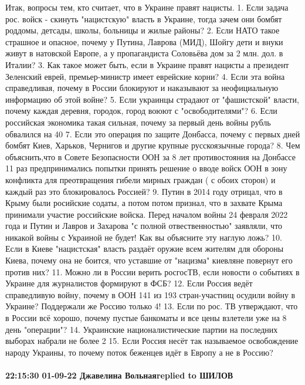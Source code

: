 Итак, вопросы тем, кто считает, что в Украине правят нацисты.
1. Если задача рос. войск - скинуть "нацистскую" власть в Украине, тогда зачем они бомбят роддомы, детсады, школы, больницы и жилые районы?
2. Если НАТО такое страшное и опасное, почему у Путина, Лаврова (МИД), Шойгу дети и внуки живут в натовской Европе, а у пропагандиста Соловьёва дом за 2 млн. дол. в Италии?
3. Как такое может быть, если в Украине правят нацисты а президент Зеленский еврей, премьер-министр имеет еврейские корни?
4. Если эта война справедливая, почему в России блокируют и наказывают за неофициальную информацию об этой войне?
5. Если украинцы страдают от "фашистской" власти, почему каждая деревня, городок, город воюют с "освободителями"?
6. Если российская экономика такая сильная, почему за первый день войны рубль обвалился на 40%
7. Если это операция по защите Донбасса, почему с первых дней бомбят Киев, Харьков, Чернигов и другие крупные русскоязычные города?
8. Чем объяснить,что в Совете Безопасности ООН за 8 лет противостояния на Донбассе 11 раз предпринимались попытки принять решение о вводе войск ООН в зону конфликта для преотвращения гибели мирных граждан ( с обоих сторон) и каждый раз это блокировалось Россией?
9. Путин в 2014 году отрицал, что в Крыму были росийские содаты, а потом потом признал, что в захвате Крыма принимали участие российские войска. Перед началом войны 24 февраля 2022 года и Путин и Лавров и Захарова "с полной отвественностью" заявляли, что никакой войны с Украиной не будет! Как вы объясните эту наглую ложь?
10. Если в Киеве "нацистская" власть раздаёт оружие всем жителям для обороны Киева, почему она не боится, что уставшие от "нацизма" киевляне повернут его против них?
11. Можно ли в России верить росгосТВ, если новости о событиях в Украине для журналистов формируют в ФСБ?
12. Если Россия ведёт справедливую войну, почему в ООН 141 из 193 стран-участниц осудили войну в Украине? Поддержали же Россию только 4!
13. Если по рос. ТВ утверждают, что в России всё хорошо, почему пустые банкоматы и все цены взлетели уже на 8 день "операции"?
14. Украинские националистические партии на последних выборах набрали не более 2%
15. Если Россия несёт так называемое освобождение народу Украины, то почему поток беженцев идёт в Европу а не в Россию?

\paragraph{22:15:30 01-09-22 Джавелина Вольнаяreplied to ШИЛОВ}


